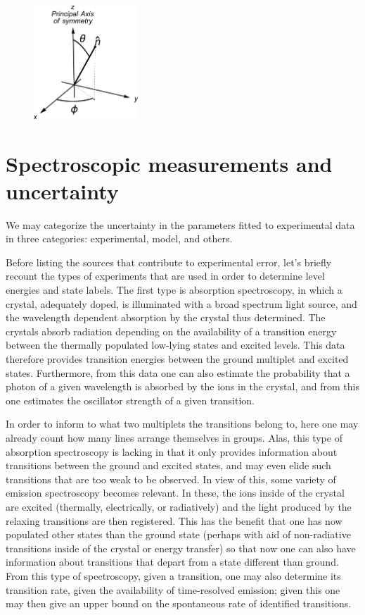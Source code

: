 \documentclass[11pt, twoside,openright]{article}
\begin{document}
\begin{figure}[h]
	\centering
	\includegraphics[width=0.35\textwidth]{./figures/coordSys.jpg}
	\label{fig:spherical-coord-sys} 
\end{figure}

\section{Spectroscopic measurements and uncertainty}\label{section:uncertainty}

We may categorize the uncertainty in the parameters fitted to experimental data in three categories: experimental, model, and others. 

Before listing the sources that contribute to experimental error, let's briefly recount the types of experiments that are used in order to determine level energies and state labels. The first type is absorption spectroscopy, in which a crystal, adequately doped, is illuminated with a broad spectrum light source, and the wavelength dependent absorption by the crystal thus determined. The crystals absorb radiation depending on the availability of a transition energy between the thermally populated low-lying states and excited levels. This data therefore provides transition energies between the ground multiplet and excited states. Furthermore, from this data one can also estimate the probability that a photon of a given wavelength is absorbed by the ions in the crystal, and from this one estimates the oscillator strength of a given transition. 

In order to inform to what two multiplets the transitions belong to, here one may already count how many lines arrange themselves in groups. Alas, this type of absorption spectroscopy is lacking in that it only provides information about transitions between the ground and excited states, and may even elide such transitions that are too weak to be observed. In view of this, some variety of emission spectroscopy becomes relevant. In these, the ions inside of the crystal are excited (thermally, electrically, or radiatively) and the light produced by the relaxing transitions are then registered. This has the benefit that one has now populated other states than the ground state (perhaps with aid of non-radiative transitions inside of the crystal or energy transfer) so that now one can also have information about transitions that depart from a state different than ground. From this type of spectroscopy,  given a transition, one may also determine its transition rate, given the availability of time-resolved emission; given this one may then give an upper bound on the spontaneous rate of identified transitions.
\end{document}
